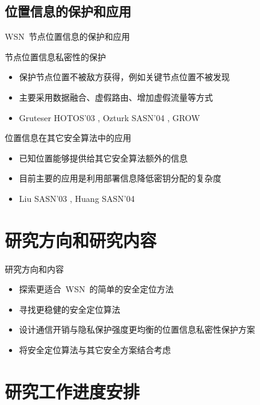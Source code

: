 \documentclass[mathserif,compress,CJKutf8, red]{beamer}
\begin{document}
\begin{CJK*}{UTF8}{song}
\subsection{位置信息的保护和应用}

\begin{frame}{WSN~节点位置信息的保护和应用}

\begin{block}{节点位置信息私密性的保护}
\begin{itemize}
\item 保护节点位置不被敌方获得，例如关键节点位置不被发现
\item 主要采用数据融合、虚假路由、增加虚假流量等方式
\item Gruteser HOTOS'03 \cite{Gruteser2003}, Ozturk SASN'04 \cite{Ozturk2004}, GROW \cite{Xi2006}
\end{itemize}
\end{block}

\bigskip

\begin{block}{位置信息在其它安全算法中的应用}
\begin{itemize}
\item 已知位置能够提供给其它安全算法额外的信息
\item 目前主要的应用是利用部署信息降低密钥分配的复杂度
\item Liu SASN'03 \cite{Liu2003}, Huang SASN'04 \cite{Huang2004}
\end{itemize}
\end{block}
\end{frame}

\section{研究方向和研究内容}

\begin{frame}{研究方向和内容}
\begin{itemize}
\item 探索更适合~WSN~的简单的安全定位方法
\item 寻找更稳健的安全定位算法
\item 设计通信开销与隐私保护强度更均衡的位置信息私密性保护方案
\item 将安全定位算法与其它安全方案结合考虑
\end{itemize}

\end{frame}

\section{研究工作进度安排}


\end{CJK*}
\end{document}
